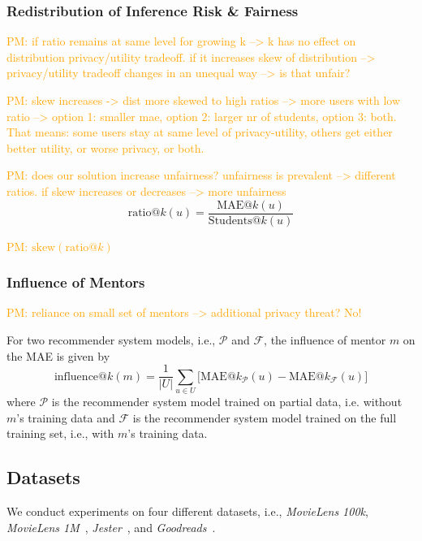 \documentclass[manuscript,review,anonymous]{acmart}
\newcommand{\pmu}[1]{
        \textcolor{orange}{PM: #1}}
\begin{document}
\subsubsection{Redistribution of Inference Risk \& Fairness}
\pmu{if ratio remains at same level for growing k --> k has no effect on distribution privacy/utility tradeoff. if it increases skew of distribution --> privacy/utility tradeoff changes in an unequal way --> is that unfair?}
\pmu{skew increases -> dist more skewed to high ratios --> more users with low ratio --> option 1: smaller mae, option 2: larger nr of students, option 3: both. That means: some users stay at same level of privacy-utility, others get either better utility, or worse privacy, or both.}
\pmu{does our solution increase unfairness? unfairness is prevalent --> different ratios. if skew increases or decreases --> more unfairness}
\begin{equation}
    \mathrm{ratio}@k(u) = \frac{\mathrm{MAE}@k(u)}{\mathrm{Students}@k(u)}
\end{equation}

\pmu{$\mathrm{skew}(\mathrm{ratio}@k)$~\cite{kokoska2000crc}}

\subsubsection{Influence of Mentors}
\pmu{reliance on small set of mentors --> additional privacy threat? No!}

For two recommender system models, i.e., $\mathcal{P}$ and $\mathcal{F}$, the influence of mentor $m$ on the MAE is given by
\begin{equation}
    \mathrm{influence}@k(m) = \frac{1}{|U|}\sum_{u \in U} \big[ \mathrm{MAE}@k_{\mathcal{P}}(u) - \mathrm{MAE}@k_{\mathcal{F}}(u) \big]
\end{equation}
where $\mathcal{P}$ is the recommender system model trained on partial data, i.e. without $m$'s training data and $\mathcal{F}$ is the recommender system model trained on the full training set, i.e., with $m$'s training data.

\subsection{Datasets}
We conduct experiments on four different datasets, i.e., \emph{MovieLens 100k}\cite{harper2015movielens}, \emph{MovieLens 1M}~\cite{harper2015movielens}, \emph{Jester}~\cite{goldberg2001eigentaste}, and \emph{Goodreads}~\cite{DBLP:conf/recsys/WanM18,DBLP:conf/acl/WanMNM19}.
\end{document}
